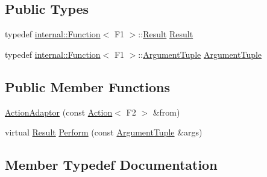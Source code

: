 \subsection*{Public Types}
\begin{DoxyCompactItemize}
\item 
typedef \hyperlink{structtesting_1_1internal_1_1_function}{internal\+::\+Function}$<$ F1 $>$\+::\hyperlink{classtesting_1_1internal_1_1_action_adaptor_afa8f7872b6db3d8f1545fd98b45b0b95}{Result} \hyperlink{classtesting_1_1internal_1_1_action_adaptor_afa8f7872b6db3d8f1545fd98b45b0b95}{Result}
\item 
typedef \hyperlink{structtesting_1_1internal_1_1_function}{internal\+::\+Function}$<$ F1 $>$\+::\hyperlink{classtesting_1_1internal_1_1_action_adaptor_a4f78fb73f97b72fea8a93b78a8ab5704}{Argument\+Tuple} \hyperlink{classtesting_1_1internal_1_1_action_adaptor_a4f78fb73f97b72fea8a93b78a8ab5704}{Argument\+Tuple}
\end{DoxyCompactItemize}
\subsection*{Public Member Functions}
\begin{DoxyCompactItemize}
\item 
\hyperlink{classtesting_1_1internal_1_1_action_adaptor_a24ba3330ef3cc365b956c50ec73e4177}{Action\+Adaptor} (const \hyperlink{classtesting_1_1_action}{Action}$<$ F2 $>$ \&from)
\item 
virtual \hyperlink{classtesting_1_1internal_1_1_action_adaptor_afa8f7872b6db3d8f1545fd98b45b0b95}{Result} \hyperlink{classtesting_1_1internal_1_1_action_adaptor_a8d8a47a31f068cf6e0c95b91605d5540}{Perform} (const \hyperlink{classtesting_1_1internal_1_1_action_adaptor_a4f78fb73f97b72fea8a93b78a8ab5704}{Argument\+Tuple} \&args)
\end{DoxyCompactItemize}


\subsection{Member Typedef Documentation}
\mbox{\label{classtesting_1_1internal_1_1_action_adaptor_a4f78fb73f97b72fea8a93b78a8ab5704}} 
